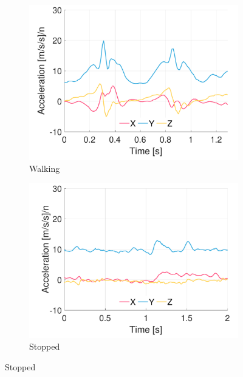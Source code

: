 \begin{figure}[p]
\centering
    \begin{subfigure}[b]{0.49\textwidth}
         \centering
         \includegraphics[width=\textwidth]{content/3-Methods/example-data/ch3_example_data_subject_01_chest_accel_activity_walking.pdf}
         \caption{Walking}
    \end{subfigure}
    \begin{subfigure}[b]{0.49\textwidth}
         \centering
         \includegraphics[width=\textwidth]{content/3-Methods/example-data/ch3_example_data_subject_01_chest_accel_activity_stop.pdf}
         \caption{Stopped}
    \end{subfigure}
    

\end{figure}
